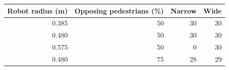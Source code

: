 \begin{tabular}{rrrr}
\toprule
Robot radius (m) & Opposing pedestrians (\%) & Narrow & Wide \\
\midrule
0.385 & 50 & 30 & 30 \\
0.480 & 50 & 30 & 30 \\
0.575 & 50 & \cellcolor{tableblue}0 & 30 \\
0.480 & 75 & 28 & 29 \\
\bottomrule
\end{tabular}

